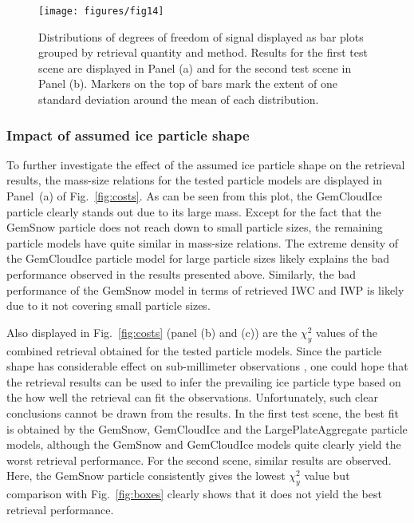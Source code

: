 \documentclass[journal abbreviation, manuscript]{copernicus}
\begin{document}
\begin{figure}
\centering
\texttt{[image: figures/fig14]}
\caption{Distributions of degrees of freedom of signal displayed as bar plots
  grouped by retrieval quantity and method. Results for the first test scene are
  displayed in Panel (a) and for the second test scene in Panel (b). Markers on
  the top of bars mark the extent of one standard deviation around the mean of
  each distribution.}
\label{fig:dofs}
\end{figure}

\subsubsection{Impact of assumed ice particle shape}



To further investigate the effect of the assumed ice particle shape on the
retrieval results, the mass-size relations for the tested particle models are
displayed in Panel~(a) of Fig.~\ref{fig:costs}. As can be seen from this plot,
the GemCloudIce particle clearly stands out due to its large mass. Except for
the fact that the GemSnow particle does not reach down to small particle sizes,
the remaining particle models have quite similar in mass-size relations. The
extreme density of the GemCloudIce particle model for large particle sizes likely
explains the bad performance observed in the results presented above. Similarly,
the bad performance of the GemSnow model in terms of retrieved IWC and IWP is likely
due to it not covering small particle sizes.

Also displayed in Fig.~\ref{fig:costs} (panel (b) and (c)) are the $\chi^2_y$
values of the combined retrieval obtained for the tested particle models. Since
the particle shape has considerable effect on sub-millimeter observations
\citep{ekelund19}, one could hope that the retrieval results can be used to
infer the prevailing ice particle type based on the how well the retrieval can
fit the observations. Unfortunately, such clear conclusions cannot be drawn from
the results. In the first test scene, the best fit is obtained by the GemSnow,
GemCloudIce and the LargePlateAggregate particle models, although the GemSnow
and GemCloudIce models quite clearly yield the worst retrieval performance. For
the second scene, similar results are observed. Here, the GemSnow particle
consistently gives the lowest $\chi^2_y$ value but comparison with
Fig.~\ref{fig:boxes} clearly shows that it does not yield the best retrieval
performance.
\end{document}

